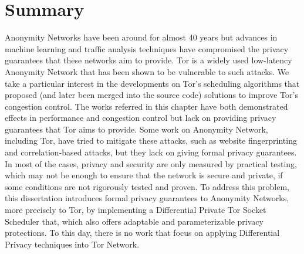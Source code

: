 \section{Summary}\label{sec:related_work_summary}

Anonymity Networks have been around for almost 40 years but advances in machine learning and traffic analysis techniques have compromised the privacy guarantees that these networks aim to provide. Tor is a widely used low-latency Anonymity Network that has been shown to be vulnerable to such attacks. We take a particular interest in the developments on Tor's scheduling algorithms that proposed (and later been merged into the source code) solutions to improve Tor's congestion control. The works referred in this chapter have both demonstrated effects in performance and congestion control but lack on providing privacy guarantees that Tor aims to provide. Some work on Anonymity Network, including Tor, have tried to mitigate these attacks, such as website fingerprinting and correlation-based attacks, but they lack on giving formal privacy guarantees. In most of the cases, privacy and security are only measured by practical testing, which may not be enough to ensure that the network is secure and private, if some conditions are not rigorously tested and proven. To address this problem, this dissertation introduces formal privacy guarantees to Anonymity Networks, more precisely to Tor, by implementing a Differential Private Tor Socket Scheduler that, which also offers adaptable and parameterizable privacy protections. To this day, there is no work that focus on applying Differential Privacy techniques into Tor Network. 